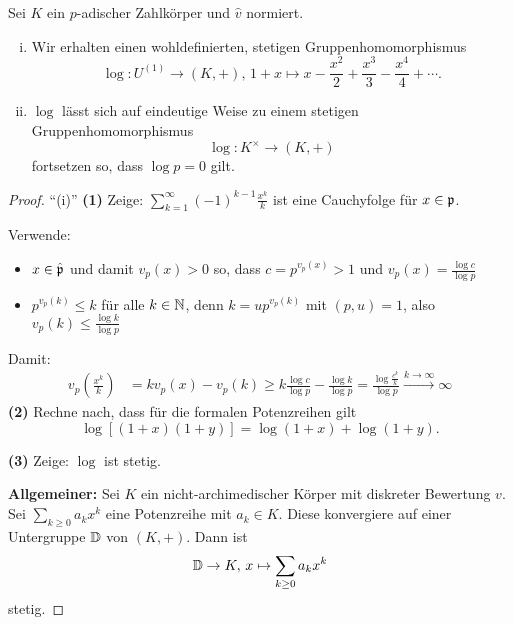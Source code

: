 \begin{Prop}
Sei $K$ ein $p$-adischer Zahlkörper und $\hat{v}$ normiert.
\begin{enumerate}[(i)]
\item Wir erhalten einen wohldefinierten, stetigen Gruppenhomomorphismus
\[ \log \colon U^{(1)} \to (K,+) , \, 1+x \mapsto x - \frac{x^2}{2} + \frac{x^3}{3} - \frac{x^4}{4} + \cdots .
\]
\item $\log$ lässt sich auf eindeutige Weise zu einem stetigen Gruppenhomomorphismus
\[ \log \colon K^\times \to (K,+)
\]
fortsetzen so, dass $\log p = 0$ gilt.
\end{enumerate}
\end{Prop}


\begin{proof}
\enquote{(i)} \textbf{(1)} Zeige: $\sum_{k=1}^{\infty} (-1)^{k-1} \frac{x^k}{k}$ ist eine Cauchyfolge für $x\in\mathfrak{p}$.

\bigskip Verwende:
\begin{itemize}
\item $x \in \hat{\mathfrak{p}}$ und damit $v_p(x)>0$ so, dass $c= p^{v_p(x)} >1$ und $v_p(x) = \frac{\log c}{\log p}$
\item $p^{v_p(k)} \leq k$ für alle $k \in \mathbb{N}$, denn $k = u p^{v_p(k)}$ mit $(p,u) = 1$, also
	$v_p(k) \leq \frac{\log k}{\log p}$
\end{itemize}
Damit:
\begin{align*}
v_p \left( \frac{x^k}{k} \right)
&= kv_p(x) - v_p(k)
\geq k \frac{\log c}{\log p} - \frac{\log k}{\log p}
= \frac{\log \frac{c^k}{k}}{\log p}
\xrightarrow{k\to \infty} \infty
\end{align*}
\textbf{(2)} Rechne nach, dass für die formalen Potenzreihen gilt
\[ \log [(1+x)(1+y)] = \log (1+x) + \log (1+y).
\]

\bigskip \textbf{(3)} Zeige: $\log$ ist stetig.

\bigskip \textbf{Allgemeiner:} Sei $K$ ein nicht-archimedischer Körper mit diskreter Bewertung $v$. Sei $\sum_{k \geq 0} a_k x^k$ eine Potenzreihe mit $a_k \in K$. Diese konvergiere auf einer Untergruppe $\mathbb{D}$ von $(K,+)$. Dann ist
\[ \mathbb{D} \to K, \, x \mapsto \sum_{k \geq 0} a_k x^k
\]
stetig.


\end{proof}
